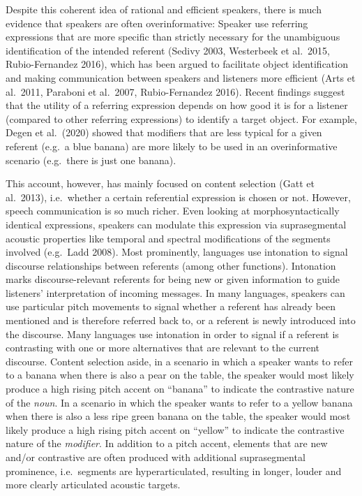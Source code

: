 \documentclass[
  english,
  man]{apa6}
\begin{document}
Despite this coherent idea of rational and efficient speakers, there is much evidence that speakers are often overinformative: Speaker use referring expressions that are more specific than strictly necessary for the unambiguous identification of the intended referent (Sedivy 2003, Westerbeek et al.~2015, Rubio-Fernandez 2016), which has been argued to facilitate object identification and making communication between speakers and listeners more efficient (Arts et al.~2011, Paraboni et al.~2007, Rubio-Fernandez 2016).
Recent findings suggest that the utility of a referring expression depends on how good it is for a listener (compared to other referring expressions) to identify a target object.
For example, Degen et al.~(2020) showed that modifiers that are less typical for a given referent (e.g.~a blue banana) are more likely to be used in an overinformative scenario (e.g.~there is just one banana).

This account, however, has mainly focused on content selection (Gatt et al.~2013), i.e.~whether a certain referential expression is chosen or not.
However, speech communication is so much richer.
Even looking at morphosyntactically identical expressions, speakers can modulate this expression via suprasegmental acoustic properties like temporal and spectral modifications of the segments involved (e.g.~Ladd 2008).
Most prominently, languages use intonation to signal discourse relationships between referents (among other functions).
Intonation marks discourse-relevant referents for being new or given information to guide listeners' interpretation of incoming messages.
In many languages, speakers can use particular pitch movements to signal whether a referent has already been mentioned and is therefore referred back to, or a referent is newly introduced into the discourse.
Many languages use intonation in order to signal if a referent is contrasting with one or more alternatives that are relevant to the current discourse.
Content selection aside, in a scenario in which a speaker wants to refer to a banana when there is also a pear on the table, the speaker would most likely produce a high rising pitch accent on \enquote{banana} to indicate the contrastive nature of the \emph{noun}.
In a scenario in which the speaker wants to refer to a yellow banana when there is also a less ripe green banana on the table, the speaker would most likely produce a high rising pitch accent on \enquote{yellow} to indicate the contrastive nature of the \emph{modifier}. In addition to a pitch accent, elements that are new and/or contrastive are often produced with additional suprasegmental prominence, i.e.~segments are hyperarticulated, resulting in longer, louder and more clearly articulated acoustic targets.
\end{document}
